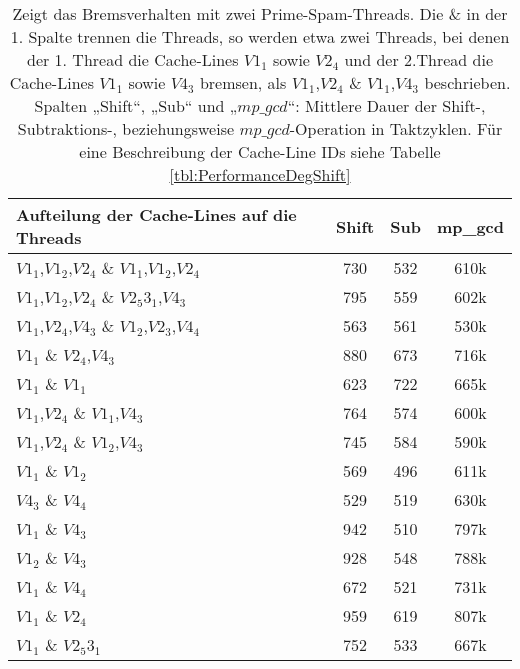 \begin{table}[h]
\caption{Zeigt das Bremsverhalten mit zwei Prime-Spam-Threads. Die \& in der 1. Spalte trennen die Threads, so werden etwa zwei Threads, bei denen der 1. Thread die Cache-Lines $V1_1$ sowie $V2_4$ und der 2.Thread die Cache-Lines $V1_1$ sowie $V4_3$ bremsen, als $V1_1$,$V2_4$ \& $V1_1$,$V4_3$ beschrieben. Spalten „Shift“, „Sub“ und „$mp\_gcd$“: Mittlere Dauer der Shift-, Subtraktions-, beziehungsweise $mp\_gcd$-Operation in Taktzyklen. Für eine Beschreibung der Cache-Line IDs siehe Tabelle \ref{tbl:PerformanceDegShift}}
\label{tbl:PerformanceDegShiftMultithreadTwo}
\begin{tabular}{lccc}
\toprule
Aufteilung der Cache-Lines auf die Threads & Shift & Sub & mp\_gcd \\
\midrule
$V1_1$,$V1_2$,$V2_4$ \& $V1_1$,$V1_2$,$V2_4$                       & 730   & 532 & 610k    \\
$V1_1$,$V1_2$,$V2_4$ \& $V2_5 3_1$,$V4_3$                         & 795   & 559 & 602k    \\
$V1_1$,$V2_4$,$V4_3$ \& $V1_2$,$V2_3$,$V4_4$                     & 563   & 561 & 530k    \\
$V1_1$ \& $V2_4$,$V4_3$                               & 880   & 673 & 716k    \\
$V1_1$ \& $V1_1$                                   & 623   & 722 & 665k    \\
$V1_1$,$V2_4$ \& $V1_1$,$V4_3$                            & 764   & 574 & 600k    \\
$V1_1$,$V2_4$ \& $V1_2$,$V4_3$                            & 745   & 584 & 590k    \\
$V1_1$ \& $V1_2$                                   & 569   & 496 & 611k    \\
$V4_3$ \& $V4_4$                                 & 529   & 519 & 630k    \\
$V1_1$ \& $V4_3$                                  & 942   & 510 & 797k    \\
$V1_2$ \& $V4_3$                                  & 928   & 548 & 788k    \\
$V1_1$ \& $V4_4$                                  & 672   & 521 & 731k    \\
$V1_1$ \& $V2_4$                                   & 959   & 619 & 807k    \\
$V1_1$ \& $V2_5 3_1$                                   & 752   & 533 & 667k    \\
\bottomrule
\end{tabular}
\end{table}

